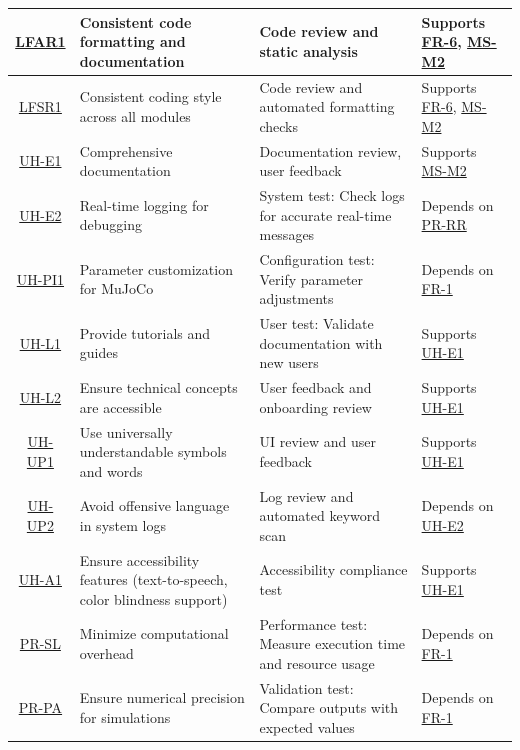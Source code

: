 \documentclass[12pt]{article}
\begin{document}
\begin{landscape}
\begin{longtable}{|c|p{6cm}|p{5cm}|p{4cm}|}
    \hline
    \hyperref[LFAR1]{LFAR1} & Consistent code formatting and documentation & Code review and static analysis & Supports \hyperref[FR-6]{FR-6}, \hyperref[MS-M2]{MS-M2} \\
    \hline
    \hyperref[LFSR1]{LFSR1} & Consistent coding style across all modules & Code review and automated formatting checks & Supports \hyperref[FR-6]{FR-6}, \hyperref[MS-M2]{MS-M2} \\
    \hline
    \hyperref[UH-E1]{UH-E1} & Comprehensive documentation & Documentation review, user feedback & Supports \hyperref[MS-M2]{MS-M2} \\
    \hline
    \hyperref[UH-E2]{UH-E2} & Real-time logging for debugging & System test: Check logs for accurate real-time messages & Depends on \hyperref[PR-RR]{PR-RR} \\
    \hline
    \hyperref[UH-PI1]{UH-PI1} & Parameter customization for MuJoCo & Configuration test: Verify parameter adjustments & Depends on \hyperref[FR-1]{FR-1} \\
    \hline
    \hyperref[UH-L1]{UH-L1} & Provide tutorials and guides & User test: Validate documentation with new users & Supports \hyperref[UH-E1]{UH-E1} \\
    \hline
    \hyperref[UH-L2]{UH-L2} & Ensure technical concepts are accessible & User feedback and onboarding review & Supports \hyperref[UH-E1]{UH-E1} \\
    \hline
    \hyperref[UH-UP1]{UH-UP1} & Use universally understandable symbols and words & UI review and user feedback & Supports \hyperref[UH-E1]{UH-E1} \\
    \hline
    \hyperref[UH-UP2]{UH-UP2} & Avoid offensive language in system logs & Log review and automated keyword scan & Depends on \hyperref[UH-E2]{UH-E2} \\
    \hline
    \hyperref[UH-A1]{UH-A1} & Ensure accessibility features (text-to-speech, color blindness support) & Accessibility compliance test & Supports \hyperref[UH-E1]{UH-E1} \\
    \hline
    \hyperref[PR-SL]{PR-SL} & Minimize computational overhead & Performance test: Measure execution time and resource usage & Depends on \hyperref[FR-1]{FR-1} \\
    \hline
    \hyperref[PR-PA]{PR-PA} & Ensure numerical precision for simulations & Validation test: Compare outputs with expected values & Depends on \hyperref[FR-1]{FR-1} \\

\end{longtable}
\end{landscape}
\end{document}
